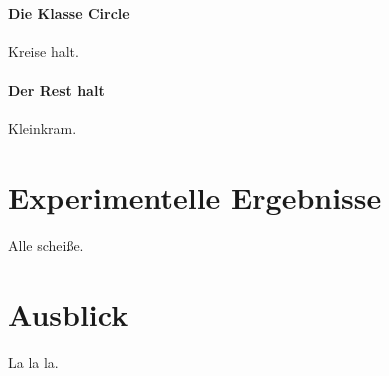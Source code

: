 \documentclass[a4paper,twoside]{report}
\theoremstyle{plain}
\theoremstyle{definition}
\begin{document}
\subsubsection{Die Klasse Circle}
Kreise halt.\cite{NSAbook}

\subsubsection{Der Rest halt}
Kleinkram.

\newpage
\chapter{Experimentelle Ergebnisse}
Alle scheiße.

\newpage
\chapter{Ausblick}
La la la.

{}

\end{document}
